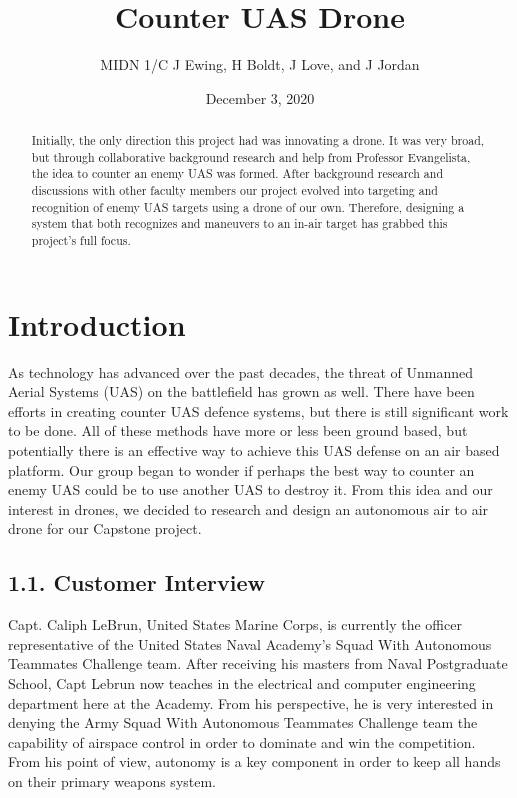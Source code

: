 \documentclass[10pt]{article}
\title{Counter UAS Drone}
\author{MIDN 1/C J Ewing, H Boldt, J Love, and J Jordan}
\date{December 3, 2020}
\begin{document}
\maketitle

\begin{abstract}
Initially, the only direction this project had was innovating a drone.  It was very broad, but through collaborative background research and help from Professor Evangelista, the idea to counter an enemy UAS was formed. After background research and discussions with other faculty members our project evolved into targeting and recognition of enemy UAS targets using a drone of our own. Therefore, designing a system that both recognizes and maneuvers to an in-air target has grabbed this project's full focus.  
\end{abstract}


\section{Introduction}
	As technology has advanced over the past decades, the threat of Unmanned Aerial Systems (UAS) on the battlefield has grown as well.  There have been efforts in creating counter UAS defence systems, but there is still significant work to be done.  All of these methods have more or less been ground based, but potentially there is an effective way to achieve this UAS defense on an air based platform.  Our group began to wonder if perhaps the best way to counter an enemy UAS could be to use another UAS to destroy it.  From this idea and our interest in drones, we decided to research and design an autonomous air to air drone for our Capstone project.  
        
\subsection{1.1. Customer Interview}
Capt. Caliph LeBrun, United States Marine Corps, is currently the officer representative of the United States Naval Academy’s Squad With Autonomous Teammates Challenge team. After receiving his masters from Naval Postgraduate School, Capt Lebrun now teaches in the electrical and computer engineering department here at the Academy. From his perspective, he is very interested in denying the Army Squad With Autonomous Teammates Challenge team the capability of airspace control in order to dominate and win the competition. From his point of view, autonomy is a key component in order to keep all hands on their primary weapons system.  
        
\end{document}
